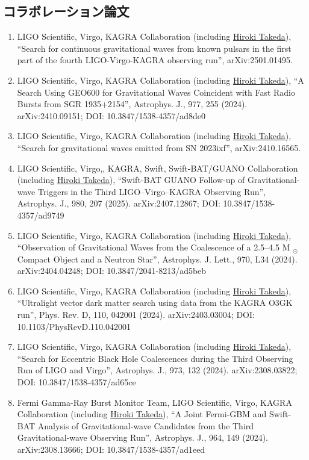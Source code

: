 \documentclass[uplatex, 11pt]{jsarticle}
\begin{document}
\subsection*{コラボレーション論文}
\begin{enumerate}
\item LIGO Scientific, Virgo, KAGRA Collaboration (including \uline{Hiroki Takeda}), “Search for continuous gravitational waves from known pulsars in the first part of the fourth LIGO-Virgo-KAGRA observing run”, arXiv:2501.01495.
\item LIGO Scientific, Virgo, KAGRA Collaboration (including \uline{Hiroki Takeda}), “A Search Using GEO600 for Gravitational Waves Coincident with Fast Radio Bursts from SGR 1935+2154”, Astrophys. J., 977, 255 (2024). arXiv:2410.09151; DOI: 10.3847/1538-4357/ad8de0
\item LIGO Scientific, Virgo, KAGRA Collaboration (including \uline{Hiroki Takeda}), “Search for gravitational waves emitted from SN 2023ixf”, arXiv:2410.16565.
\item LIGO Scientific, Virgo,, KAGRA, Swift, Swift-BAT/GUANO Collaboration (including \uline{Hiroki Takeda}), “Swift-BAT GUANO Follow-up of Gravitational-wave Triggers in the Third LIGO–Virgo–KAGRA Observing Run”, Astrophys. J., 980, 207 (2025). arXiv:2407.12867; DOI: 10.3847/1538-4357/ad9749
\item LIGO Scientific, Virgo, KAGRA Collaboration (including \uline{Hiroki Takeda}), “Observation of Gravitational Waves from the Coalescence of a 2.5–4.5 M $_⊙$ Compact Object and a Neutron Star”, Astrophys. J. Lett., 970, L34 (2024). arXiv:2404.04248; DOI: 10.3847/2041-8213/ad5beb
\item LIGO Scientific, Virgo, KAGRA Collaboration (including \uline{Hiroki Takeda}), “Ultralight vector dark matter search using data from the KAGRA O3GK run”, Phys. Rev. D, 110, 042001 (2024). arXiv:2403.03004; DOI: 10.1103/PhysRevD.110.042001
\item LIGO Scientific, Virgo, KAGRA Collaboration (including \uline{Hiroki Takeda}), “Search for Eccentric Black Hole Coalescences during the Third Observing Run of LIGO and Virgo”, Astrophys. J., 973, 132 (2024). arXiv:2308.03822; DOI: 10.3847/1538-4357/ad65ce
\item Fermi Gamma-Ray Burst Monitor Team, LIGO Scientific, Virgo, KAGRA Collaboration (including \uline{Hiroki Takeda}), “A Joint Fermi-GBM and Swift-BAT Analysis of Gravitational-wave Candidates from the Third Gravitational-wave Observing Run”, Astrophys. J., 964, 149 (2024). arXiv:2308.13666; DOI: 10.3847/1538-4357/ad1eed

\end{enumerate}
\end{document}
